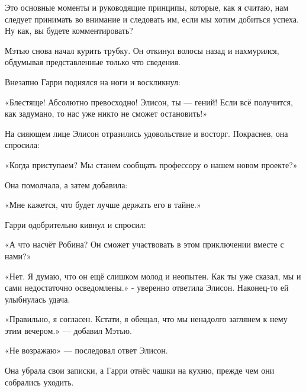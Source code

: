 \documentclass[a4paper,12pt]{book}
\begin{document}
\par
Это основные моменты и руководящие принципы, которые, как я считаю, нам следует принимать во внимание и следовать им, если мы хотим добиться успеха. Ну как, вы будете комментировать?\\
\par
Мэтью снова начал курить трубку. Он откинул волосы назад и нахмурился, обдумывая представленные только что сведения.\\
\par
Внезапно Гарри поднялся на ноги и воскликнул:
\par
«Блестяще! Абсолютно превосходно! Элисон, ты — гений! Если всё получится, как задумано, то нас уже никто не сможет остановить!»
\par
На сияющем лице Элисон отразились удовольствие и восторг. Покраснев, она спросила:
\par
«Когда приступаем? Мы станем сообщать профессору о нашем новом проекте?»
\par
Она помолчала, а затем добавила:
\par
«Мне кажется, что будет лучше держать его в тайне.»
\par
Гарри одобрительно кивнул и спросил:
\par
«А что насчёт Робина? Он сможет участвовать в этом приключении вместе с нами?»
\par
«Нет. Я думаю, что он ещё слишком молод и неопытен. Как ты уже сказал, мы и сами недостаточно осведомлены.» - уверенно ответила Элисон. Наконец-то ей улыбнулась удача.
\par
«Правильно, я согласен. Кстати, я обещал, что мы ненадолго заглянем к нему этим вечером.» — добавил Мэтью.
\par
«Не возражаю» — последовал ответ Элисон.\\
\par
Она убрала свои записки, а Гарри отнёс чашки на кухню, прежде чем они собрались уходить.
\end{document}
